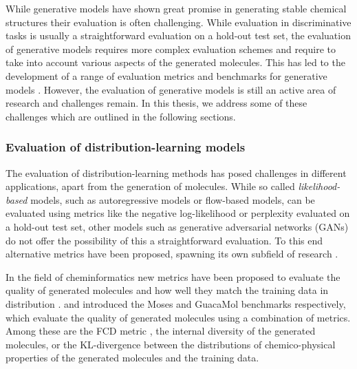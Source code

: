 While generative models have shown great promise in generating stable chemical
structures their evaluation is often challenging. While evaluation in
discriminative tasks is usually a straightforward evaluation on a hold-out test
set, the evaluation of generative models requires more complex evaluation
schemes and require to take into account various aspects of the generated
molecules. This has led to the development of a range of evaluation metrics
\citep{preuerFrechetChemNetDistance2018,gaoSynthesizabilityMoleculesProposed2020}
and benchmarks for generative models
\citep{polykovskiyMolecularSetsMOSES2020,brownGuacaMolBenchmarkingModels2019}.
However, the evaluation of generative models is still an active area of research
and challenges remain. In this thesis, we address some of these challenges which
are outlined in the following sections.

\subsubsection{Evaluation of distribution-learning models}
The evaluation of distribution-learning methods has posed challenges in
different applications, apart from the generation of molecules. While so called
\emph{likelihood-based} models, such as autoregressive models or flow-based
models, can be evaluated using metrics like the negative log-likelihood or
perplexity evaluated on a hold-out test set, other models such as generative
adversarial networks (GANs) \citep{goodfellowGenerativeAdversarialNetworks2014}
do not offer the possibility of this a straightforward evaluation. To this end
alternative metrics have been proposed, spawning its own subfield of research
\citep{heuselGANsTrainedTwo2017}.

In the field of cheminformatics new metrics have been proposed to evaluate the
quality of generated molecules and how well they match the training data in
distribution \citep{preuerFrechetChemNetDistance2018}.
\citet{polykovskiyMolecularSetsMOSES2020} and
\citet{brownGuacaMolBenchmarkingModels2019} introduced the Moses and GuacaMol
benchmarks respectively, which evaluate the quality of generated molecules using
a combination of metrics. Among these are the FCD metric
\citep{preuerFrechetChemNetDistance2018}, the internal diversity
\citep{benhendaChemGANChallengeDrug2017} of the generated molecules, or the
KL-divergence between the distributions of chemico-physical properties of the
generated molecules and the training data.

